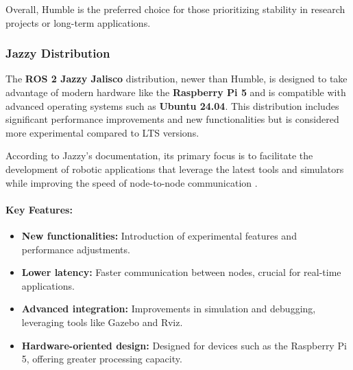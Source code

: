 Overall, Humble is the preferred choice for those prioritizing stability in research projects or long-term applications.

\subsubsection{Jazzy Distribution}

The \textbf{ROS 2 Jazzy Jalisco} distribution, newer than Humble, is designed to take advantage of modern hardware like the \textbf{Raspberry Pi 5} and is compatible with advanced operating systems such as \textbf{Ubuntu 24.04}. This distribution includes significant performance improvements and new functionalities but is considered more experimental compared to LTS versions.

According to Jazzy's documentation, its primary focus is to facilitate the development of robotic applications that leverage the latest tools and simulators while improving the speed of node-to-node communication \cite{jazzy_documentation}.

\paragraph{Key Features:}
\begin{itemize}
    \item \textbf{New functionalities:} Introduction of experimental features and performance adjustments.
    \item \textbf{Lower latency:} Faster communication between nodes, crucial for real-time applications.
    \item \textbf{Advanced integration:} Improvements in simulation and debugging, leveraging tools like Gazebo and Rviz.
    \item \textbf{Hardware-oriented design:} Designed for devices such as the Raspberry Pi 5, offering greater processing capacity.
\end{itemize}

